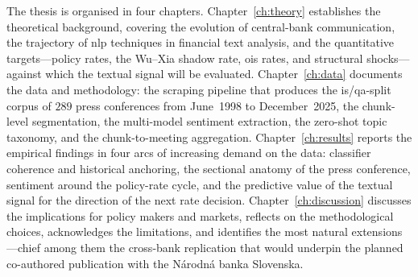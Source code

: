 The thesis is organised in four chapters. Chapter~\ref{ch:theory} establishes the theoretical background, covering the evolution of central-bank communication, the trajectory of \gls{nlp} techniques in financial text analysis, and the quantitative targets---policy rates, the Wu--Xia shadow rate, \gls{ois} rates, and structural shocks---against which the textual signal will be evaluated. Chapter~\ref{ch:data} documents the data and methodology: the scraping pipeline that produces the \gls{is}/\gls{qa}-split corpus of $289$ press conferences from June~1998 to December~2025, the chunk-level segmentation, the multi-model sentiment extraction, the zero-shot topic taxonomy, and the chunk-to-meeting aggregation. Chapter~\ref{ch:results} reports the empirical findings in four arcs of increasing demand on the data: classifier coherence and historical anchoring, the sectional anatomy of the press conference, sentiment around the policy-rate cycle, and the predictive value of the textual signal for the direction of the next rate decision. Chapter~\ref{ch:discussion} discusses the implications for policy makers and markets, reflects on the methodological choices, acknowledges the limitations, and identifies the most natural extensions---chief among them the cross-bank replication that would underpin the planned co-authored publication with the Národná banka Slovenska.